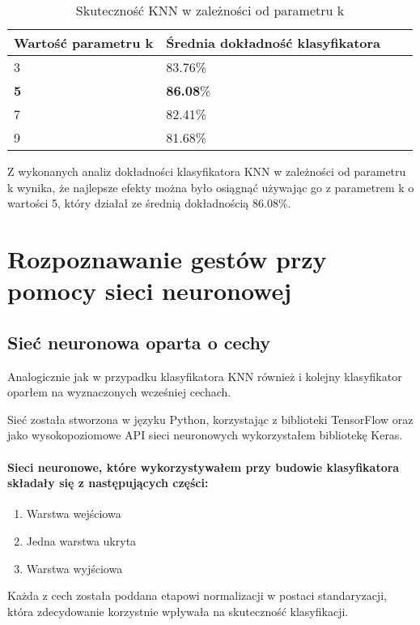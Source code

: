 \documentclass[a4paper,12pt,twoside,openany]{report}
\begin{document}
\begin{table}[H]
	\centering
	\begin{tabularx}{\textwidth}{|X|X|X|X|}
		\hline
		\textbf{Wartość parametru k} & \textbf{Średnia dokładność klasyfikatora}    \\ 
		
		\hline
		3 & 83.76\% \\ 
		\hline
		\textbf{5} & \textbf{86.08}\% \\
		\hline
		7 & 82.41\% \\
		\hline
		9 & 81.68\% \\
		\hline
	\end{tabularx}
	
	\caption{Skuteczność KNN w zależności od parametru k}
\end{table}
	
Z wykonanych analiz dokładności klasyfikatora KNN w zależności od parametru k wynika, że najlepsze efekty można było osiągnąć używając go z parametrem k o wartości 5, który działał ze średnią dokładnością 86.08\%.
\section{Rozpoznawanie gestów przy pomocy sieci neuronowej}
\subsection{Sieć neuronowa oparta o cechy}
	Analogicznie jak w przypadku klasyfikatora KNN również i  kolejny klasyfikator oparłem na wyznaczonych wcześniej cechach.
	
	Sieć została stworzona w języku Python, korzystając z biblioteki TensorFlow oraz jako wysokopoziomowe API sieci neuronowych wykorzystałem bibliotekę Keras.
	
	\paragraph{Sieci neuronowe, które wykorzystywałem przy budowie klasyfikatora składały się z następujących części:}
	\begin{enumerate}
		\item Warstwa wejściowa
		\item Jedna warstwa ukryta
		\item Warstwa wyjściowa
	\end{enumerate}

	\noindent
	Każda z cech została poddana etapowi normalizacji w postaci standaryzacji, która zdecydowanie korzystnie wpływała na skuteczność klasyfikacji.
	
\end{document}
